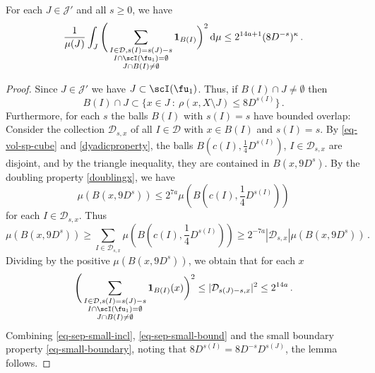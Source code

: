     \begin{lemma}
        \label{square-function-count}
        \leanok
        For each $J \in \mathcal{J}'$ and all $s \ge 0$, we have
        $$
            \frac{1}{\mu(J)} \int_J \Bigg(\sum_{\substack{I \in \mathcal{D}, s(I) = s(J) - s\\ I \cap \scI(\fu_1) = \emptyset\\
        J \cap B(I) \ne \emptyset}} \mathbf{1}_{B(I)}\bigg)^2 \, \mathrm{d}\mu \le 2^{14a+1} (8 D^{-s})^\kappa\,.
        $$
    \end{lemma}

    \begin{proof}
        \leanok
        Since $J \in \mathcal{J}'$ we have $J \subset \scI(\fu_1)$. Thus, if $B(I) \cap J \ne \emptyset$ then
    \begin{equation}
        \label{eq-sep-small-incl}
        B(I) \cap J \subset \{x \in J \ : \ \rho(x, X \setminus J) \le 8D^{s(I)}\}\,.
    \end{equation}
    Furthermore, for each $s$ the balls $B(I)$ with $s(I) = s$ have bounded overlap: Consider the collection $\mathcal{D}_{s,x}$ of all $I \in \mathcal{D}$ with $x \in B(I)$ and $s(I) = s$. By \eqref{eq-vol-sp-cube} and \eqref{dyadicproperty}, the balls $B(c(I), \frac{1}{4} D^{s(I)})$, $I \in \mathcal{D}_{s,x}$ are disjoint, and by the triangle inequality, they are contained in $B(x, 9 D^{s})$. By the doubling property \eqref{doublingx}, we have
    $$
        \mu(B(x, 9D^{s})) \le 2^{7a} \mu(B(c(I), \frac{1}{4} D^{s(I)}))
    $$
    for each $I \in \mathcal{D}_{s,x}$.
    Thus
    $$
        \mu(B(x, 9D^{s})) \ge \sum_{I \in \mathcal{D}_{s,x}} \mu(B(c(I), \frac{1}{4} D^{s(I)})) \ge 2^{-7a} |\mathcal{D}_{s,x}| \mu(B(x, 9D^{s}))\,.
    $$
    Dividing by the positive $\mu(B(x, 9D^{s}))$, we obtain that for each $x$
    \begin{equation}
        \label{eq-sep-small-bound}
        \Bigg(\sum_{\substack{I \in \mathcal{D}, s(I) = s(J) - s\\ I \cap \scI(\fu_1) = \emptyset\\
        J \cap B(I) \ne \emptyset}} \mathbf{1}_{B(I)}(x) \bigg)^2 \le |\mathcal{D}_{s(J) - s,x}|^2 \le 2^{14a} \,.
    \end{equation}
    Combining \eqref{eq-sep-small-incl}, \eqref{eq-sep-small-bound} and the small boundary property \eqref{eq-small-boundary}, noting that $8D^{s(I)}=8D^{-s}D^{s(J)}$, the lemma follows.
\end{proof}


